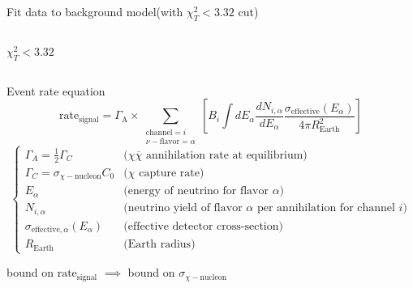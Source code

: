 \documentclass[14pt]{beamer}
\begin{document}
\begin{frame}{Fit data to background model}{(with $\chi^{2}_{T} < 3.32$ cut)}
\begin{columns}[T]
\begin{block}{\centering $\chi^{2}_{T} < 3.32$}
			\centering
		\end{block}
	\end{columns}
\end{frame}

\begin{frame}{Event rate equation}
	\begin{equation*}
		\text{rate}_{\text{signal}} = \Gamma_{\text{A}} \times
		\sum\limits_{\substack{\text{channel} = i\\ \nu-\text{flavor}= \alpha}}
		\left[
			B_{i} \int dE_{\alpha} \frac{dN_{i,\alpha}}{dE_{\alpha}}
			\frac{\sigma_{\text{effective}}(E_{\alpha})}
			{4\pi R_{\text{Earth}}^2}
		\right]
	\end{equation*}
	{\scriptsize
	\begin{equation*}
		\begin{cases}
			\Gamma_{A} = \frac{1}{2}\Gamma_{C}
				& \text{($\chi \overline{\chi}$ annihilation rate at equilibrium)}\\
			\Gamma_{C} = \sigma_{\chi-\text{nucleon}} C_{0}
				& \text{($\chi$ capture rate)}\\
			E_{\alpha}
				& \text{(energy of neutrino for flavor $\alpha$)}\\
			N_{i,\alpha}
				& \text{(neutrino yield of flavor $\alpha$ per annihilation for channel $i$)}\\
			\sigma_{\text{effective},\alpha}(E_{\alpha})
				& \text{(effective detector cross-section)}\\
			R_{\text{Earth}} & \text{(Earth radius)}
		\end{cases}
	\end{equation*}
	}

	\vspace{10mm}
	bound on $\text{rate}_{\text{signal}}$
	$\implies$ bound on $\sigma_{\chi-\mathrm{nucleon}}$
\end{frame}
\end{document}
